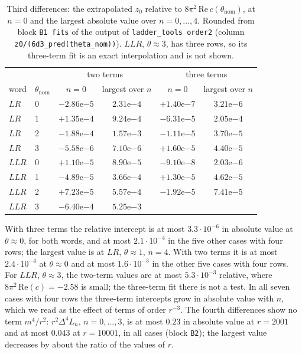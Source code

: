 \documentclass[11pt]{amsart}
\theoremstyle{definition}
\theoremstyle{remark}
\begin{document}
\begin{table}[ht]
\centering
\small
\begin{tabular}{llcccc}
\toprule
& & \multicolumn{2}{c}{two terms} & \multicolumn{2}{c}{three terms} \\
word & $\theta_{\mathrm{nom}}$ & $n = 0$ & largest over $n$ & $n = 0$ & largest over $n$ \\
\midrule
$LR$  & 0 & $-2.86\mathrm{e}{-5}$ & $2.31\mathrm{e}{-4}$ & $+1.40\mathrm{e}{-7}$ & $3.21\mathrm{e}{-6}$ \\
$LR$  & 1 & $+1.35\mathrm{e}{-4}$ & $9.24\mathrm{e}{-4}$ & $-6.31\mathrm{e}{-5}$ & $2.05\mathrm{e}{-4}$ \\
$LR$  & 2 & $-1.88\mathrm{e}{-4}$ & $1.57\mathrm{e}{-3}$ & $-1.11\mathrm{e}{-5}$ & $3.70\mathrm{e}{-5}$ \\
$LR$  & 3 & $-5.58\mathrm{e}{-6}$ & $7.10\mathrm{e}{-6}$ & $+1.60\mathrm{e}{-5}$ & $4.40\mathrm{e}{-5}$ \\
$LLR$ & 0 & $+1.10\mathrm{e}{-5}$ & $8.90\mathrm{e}{-5}$ & $-9.10\mathrm{e}{-8}$ & $2.03\mathrm{e}{-6}$ \\
$LLR$ & 1 & $-4.89\mathrm{e}{-5}$ & $3.66\mathrm{e}{-4}$ & $+1.30\mathrm{e}{-5}$ & $4.62\mathrm{e}{-5}$ \\
$LLR$ & 2 & $+7.23\mathrm{e}{-5}$ & $5.57\mathrm{e}{-4}$ & $-1.92\mathrm{e}{-5}$ & $7.41\mathrm{e}{-5}$ \\
$LLR$ & 3 & $-6.40\mathrm{e}{-4}$ & $5.25\mathrm{e}{-3}$ & & \\
\bottomrule
\end{tabular}
\caption{Third differences: the extrapolated $z_0$ relative to
$8\pi^2\,\mathrm{Re}\,c(\theta_{\mathrm{nom}})$, at $n = 0$ and the largest absolute
value over $n = 0, \dots, 4$. Rounded from block \texttt{B1 fits} of the output of
\texttt{ladder\_tools order2} (column \texttt{z0/(6d3\_pred(theta\_nom))}). $LLR$,
$\theta \approx 3$, has three rows, so its three-term fit is an exact interpolation and
is not shown.}
\label{tab:order2a}
\end{table}

With three terms the relative intercept is at most $3.3\cdot10^{-6}$ in absolute value
at $\theta \approx 0$, for both words, and at most $2.1\cdot10^{-4}$ in the five other
cases with four rows; the largest value is at $LR$, $\theta \approx 1$, $n = 4$. With
two terms it is at most $2.4\cdot10^{-4}$ at $\theta \approx 0$ and at most
$1.6\cdot10^{-3}$ in the other five cases with four rows. For $LLR$,
$\theta \approx 3$, the two-term values are at most $5.3\cdot10^{-3}$ relative, where
$8\pi^2\,\mathrm{Re}(c) = -2.58$ is small; the three-term fit there is not a test. In
all seven cases with four rows the three-term intercepts grow in absolute value with
$n$, which we read as the effect of terms of order $r^{-3}$. The fourth differences
show no term $m^4/r^2$: $r^2\Delta^4L_n$, $n = 0, \dots, 3$, is at most $0.23$ in
absolute value at $r = 2001$ and at most $0.043$ at $r = 10001$, in all cases (block
\texttt{B2}); the largest value decreases by about the ratio of the values of $r$.
\end{document}
